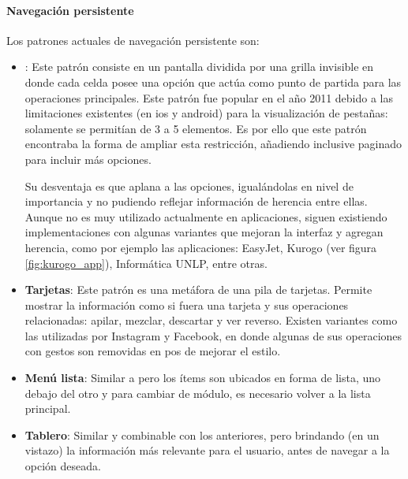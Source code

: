 \paragraph{Navegación persistente}
\label{navegacion_persistente}

Los patrones actuales de navegación persistente\cite{neil2014mobile} son:
\begin{itemize}

\item \textbf{}: Este patrón consiste en un pantalla dividida por una grilla invisible en donde cada celda posee una opción que actúa como punto de partida para las operaciones principales. 
Este patrón fue popular en el año 2011 debido a las limitaciones existentes (en \gls{ios} y \gls{android}) para la visualización de pestañas: solamente se permitían de 3 a 5 elementos. Es por ello que este patrón encontraba la forma de ampliar esta restricción, añadiendo inclusive paginado para incluir más opciones.


Su desventaja es que aplana a las opciones, igualándolas en nivel de importancia y no pudiendo reflejar  información de herencia entre ellas. Aunque  no es muy utilizado actualmente en aplicaciones, siguen existiendo implementaciones con algunas variantes que mejoran la interfaz y agregan herencia, como por ejemplo las aplicaciones: EasyJet, Kurogo (ver figura \ref{fig:kurogo_app}), Informática UNLP, entre otras.

\item \textbf{Tarjetas}: Este patrón es una metáfora de una pila de tarjetas. Permite mostrar la información como si fuera una tarjeta y sus operaciones relacionadas: apilar, mezclar, descartar y ver reverso.
Existen variantes como las utilizadas por Instagram y Facebook, en donde algunas de sus operaciones con gestos son removidas en pos de mejorar el estilo.

\item \textbf{Menú lista}: Similar a  pero los ítems son ubicados en forma de lista, uno debajo del otro y para cambiar de módulo, es necesario volver a la lista principal. 

\item \textbf{Tablero}: Similar y combinable con los anteriores, pero brindando (en un vistazo) la información más relevante para el usuario, antes de navegar a la opción deseada. 


\end{itemize}
